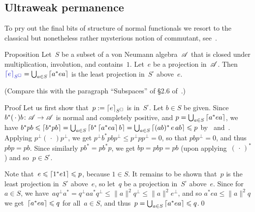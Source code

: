 \documentclass[a]{subfiles}
\begin{document}
\subsection{Ultraweak permanence}
\begin{parsec}%
\begin{point}%
To pry out the final bits of structure of normal functionals
we resort to the classical but nonetheless rather mysterious notion
of commutant, see~.
\end{point}
\begin{point}{Proposition}%
Let~$S$ be a subset of a von Neumann algebra~$\mathscr{A}$
that is closed under multiplication, involution, and contains~$1$.
Let~$e$ be a projection in~$\mathscr{A}$.
Then $\Define{\ceil{e}_{S^\square}}= 
\bigcup_{a\in S} \ceil{a^* e a}$
is the least projection in~$S^\square$
above~$e$.

(Compare this with the paragraph ``Subspaces'' of \S2.6 of~\cite{kr}.)
\begin{point}{Proof}%
Let us first show that~$p:= \left\lceil e\right\rceil_{S^\square}$
is in~$S^\square$.
Let $b\in S$ be given.
Since~$b^*(\,\cdot\,)b\colon \mathscr{A}\to\mathscr{A}$
is normal and completely positive,
and $p=\bigcup_{a\in S} \left\lceil a^*ea\right\rceil$,
we have $b^*pb\leqslant \left\lceil b^*pb\right\rceil = 
\bigcup_{a\in S} \left\lceil b^* \left\lceil a^* e a\right\rceil b \right\rceil
= \bigcup_{a\in S} \left\lceil(ab)^* \,e\, ab\right\rceil \leqslant p$
by~ and~.
Applying $p^\perp(\,\cdot\,)p^\perp$,
we get $p^\perp b^*pb p^\perp 
\leq p^\perp p p^\perp = 0$,
so that $pbp^\perp=0$,
and thus $pbp=pb$.
Since similarly $pb^* =pb^*p$,
we get  $bp=pbp=pb$
(upon applying~$(\,\cdot\,)^*$) and so~$p\in S^\square$.

Note that~$e\leqslant \left\lceil1^* e 1\right\rceil\leqslant p$, because $1\in S$.
It remains to be shown that~$p$ is the least projection in~$S^\square$
above~$e$, so let~$q$ be a projection in~$S^\square$ above~$e$.
Since for~$a\in S$,
we have~$aq^\perp a^*=  q^\perp aa^* q^\perp 
\leq \|a\|^2q^\perp \leq \|a\|^2e^\perp$,
and so $a^*ea\leq \|a\|^2q$ 
we get~$\left\lceil a^*ea\right\rceil\leqslant q$
for all~$a\in S$,
and thus~$p=\bigcup_{a\in S}\left\lceil a^*ea\right\rceil \leqslant q$.\qed
\end{point}
\end{point}


\end{parsec}
\end{document}
